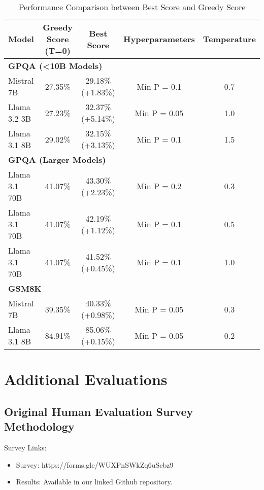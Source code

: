 \documentclass{article}
\begin{document}
\begin{table}[htbp]
\centering
\caption{Performance Comparison between Best Score and Greedy Score}
\label{tab:greedy_decoding_comparison}
\begin{tabular}{lcccc}
\hline
\textbf{Model} & \textbf{Greedy Score (T=0)} & \textbf{Best Score} & \textbf{Hyperparameters} & \textbf{Temperature} \\
\hline
\multicolumn{5}{l}{\textbf{GPQA (<10B Models)}} \\
\hline
Mistral 7B & 27.35\% & 29.18\% (+1.83\%) & Min P = 0.1 & 0.7 \\
Llama 3.2 3B & 27.23\% & 32.37\% (+5.14\%) & Min P = 0.05 & 1.0 \\
Llama 3.1 8B & 29.02\% & 32.15\% (+3.13\%) & Min P = 0.1 & 1.5 \\
\hline
\multicolumn{5}{l}{\textbf{GPQA (Larger Models)}} \\
\hline
Llama 3.1 70B & 41.07\% & 43.30\% (+2.23\%) & Min P = 0.2 & 0.3 \\
Llama 3.1 70B & 41.07\% & 42.19\% (+1.12\%) & Min P = 0.1  & 0.5 \\
Llama 3.1 70B & 41.07\% & 41.52\% (+0.45\%) & Min P = 0.1 & 1.0 \\
\hline
\multicolumn{5}{l}{\textbf{GSM8K}} \\
\hline
Mistral 7B & 39.35\% & 40.33\% (+0.98\%) & Min P = 0.05 & 0.3 \\
Llama 3.1 8B & 84.91\% & 85.06\% (+0.15\%) & Min P = 0.05 & 0.2 \\
\hline
\end{tabular}
\end{table}

\section{Additional Evaluations}

\clearpage

\subsection{Original Human Evaluation Survey Methodology}
\label{app:human_eval_methodology}

\noindent Survey Links:
\begin{itemize}
    \item Survey: https://forms.gle/WUXPnSWkZq6uScbz9
    \item Results: Available in our linked Github repository.
\end{itemize}
\end{document}
